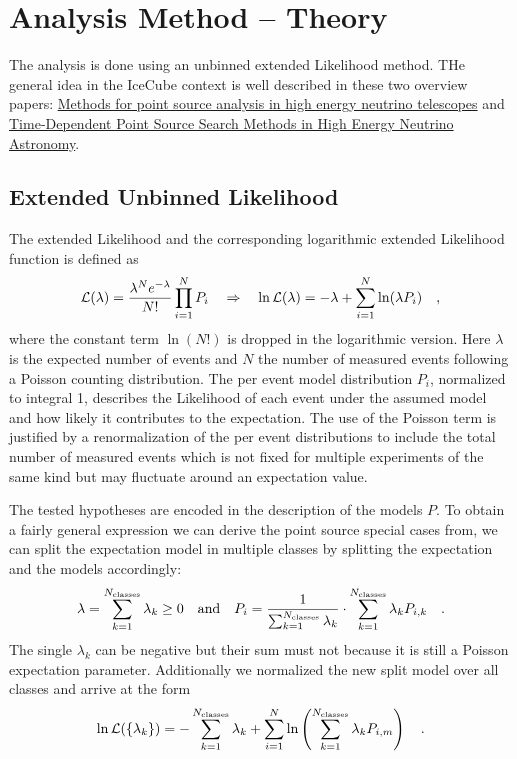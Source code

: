 \section{Analysis Method – Theory}
The analysis is done using an unbinned extended Likelihood method.
THe general idea in the IceCube context is well described in these two overview papers: \href{https://arxiv.org/abs/0801.1604}{Methods for point source analysis in high energy neutrino telescopes} and \href{https://arxiv.org/abs/0912.1572v1}{Time-Dependent Point Source Search Methods in High Energy Neutrino Astronomy}.

\subsection{Extended Unbinned Likelihood}
The extended Likelihood and the corresponding logarithmic extended Likelihood function is defined as
\begin{equation}
  \mathcal{L}(\lambda) = \frac{\lambda^N e^{-\lambda}}{N!}\prod_{i=1}^N P_i
  \quad\Rightarrow\quad
    \ln\mathcal{L}(\lambda) = -\lambda+\sum_{i=1}^N \ln(\lambda P_i)
  \quad\text{,}
\end{equation}
where the constant term $\ln(N!)$ is dropped in the logarithmic version.
Here $\lambda$ is the expected number of events and $N$ the number of measured events following a Poisson counting distribution.
The per event model distribution $P_i$, normalized to integral 1, describes the Likelihood of each event under the assumed model and how likely it contributes to the expectation.
The use of the Poisson term is justified by a renormalization of the per event distributions to include the total number of measured events which is not fixed for multiple experiments of the same kind but may fluctuate around an expectation value.

The tested hypotheses are encoded in the description of the models $P$.
To obtain a fairly general expression we can derive the point source special cases from, we can split the expectation model in multiple classes by splitting the expectation and the models accordingly:
\begin{equation}
  \lambda = \sum_{k=1}^{N_\text{classes}} \lambda_k \geq 0
  \quad\text{and}\quad
  P_i = \frac{1}{\sum_{k=1}^{N_\text{classes}} \lambda_k}\cdot
         \sum_{k=1}^{N_\text{classes}} \lambda_k P_{i,k}
  \quad\text{.}
\end{equation}
The single $\lambda_k$ can be negative but their sum must not because it is still a Poisson expectation parameter.
Additionally we normalized the new split model over all classes and arrive at the form
\begin{equation}
  \ln\mathcal{L}(\{\lambda_k\})
  = -\sum_{k=1}^{N_\text{classes}} \lambda_k +
    \sum_{i=1}^N \ln\left(\sum_{k=1}^{N_\text{classes}}
      \lambda_k P_{i,m} \right)
  \quad\text{.}
\end{equation}

